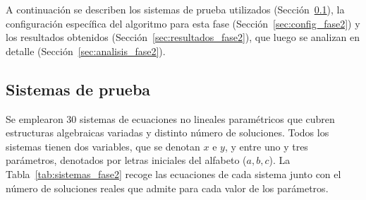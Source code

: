 A continuación se describen los sistemas de prueba utilizados (Sección~\ref{sec:sistemas_prueba_fase2}), la configuración específica del algoritmo para esta fase (Sección~\ref{sec:config_fase2}) y los resultados obtenidos (Sección~\ref{sec:resultados_fase2}), que luego se analizan en detalle (Sección~\ref{sec:analisis_fase2}).

\subsection{Sistemas de prueba} \label{sec:sistemas_prueba_fase2}

Se emplearon 30 sistemas de ecuaciones no lineales paramétricos que cubren estructuras algebraicas variadas y distinto número de soluciones. Todos los sistemas tienen dos variables, que se denotan \(x\) e \(y\), y entre uno y tres parámetros, denotados por letras iniciales del alfabeto (\(a, b, c\)). La Tabla~\ref{tab:sistemas_fase2} recoge las ecuaciones de cada sistema junto con el número de soluciones reales que admite para cada valor de los parámetros.

